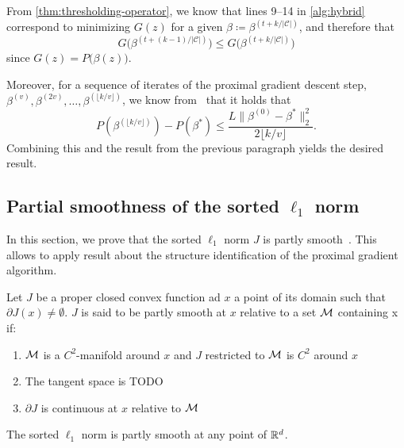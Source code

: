 From \cref{thm:thresholding-operator}, we know that lines 9--14 in \cref{alg:hybrid} correspond to minimizing \(G(z)\) for a given \(\beta \coloneqq \beta^{(t + k / |\mathcal{C}|)}\), and therefore that
\[
  G\big(\beta^{(t + (k - 1) / |\mathcal{C}|)}\big) \leq G\big(\beta^{(t + k / |\mathcal{C}|)}\big)
\]
since \(G(z) = P\big(\beta(z)\big)\).

Moreover, for a sequence of iterates of the proximal gradient descent step,
\(\beta^{(v)}, \beta^{(2v)}, \dots, \beta^{(\lfloor k / v \rfloor)}\),
we know from~\textcite[Theorem 3.1]{beck2009} that it holds that
\[
  P(\beta^{(\lfloor k / v \rfloor)}) - P(\beta^*)
  \leq \frac{L \lVert \beta^{(0)} - \beta^* \rVert_2^2}{2\lfloor k / v \rfloor}.
\]
Combining this and the result from the previous paragraph yields the desired
result.



\subsection{Partial smoothness of the sorted $\ell_1$ norm}
\label{app:sec:partly_smooth}
In this section, we prove that the sorted $\ell_1$ norm $J$ is partly smooth~\parencite{lewis2003active}.
This allows to apply result about the structure identification of the proximal gradient algorithm.

\begin{definition}
  Let $J$ be a proper closed convex function ad $x$ a point of its domain such that $\partial J(x) \neq \emptyset$.
  $J$ is said to be partly smooth at $x$ relative to a set $\mathcal{M}$ containing x if:
  \begin{enumerate}
    \item $\mathcal{M}$ is a $C^2$-manifold around $x$ and $J$ restricted to $\mathcal{M}$ is $C^2$ around $x$
    \item The tangent space is TODO
    \item $\partial J$ is continuous at $x$ relative to $\mathcal{M}$
  \end{enumerate}
\end{definition}

\begin{proposition}
  The sorted $\ell_1$ norm is partly smooth at any point of $\mathbb{R}^d$.
\end{proposition}

